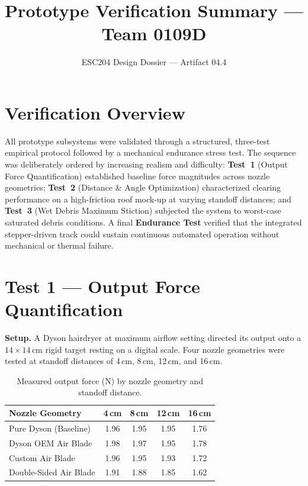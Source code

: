 \documentclass[12pt]{article}
\title{\vspace{-2cm}\textbf{Prototype Verification Summary --- Team 0109D}\vspace{-0.5cm}}
\author{ESC204 Design Dossier \textnormal{--- Artifact 04.4}}
\date{\vspace{-0.5cm}}
\begin{document}
\maketitle
\thispagestyle{empty}

\section{Verification Overview}

All prototype subsystems were validated through a structured, three-test empirical protocol followed by a mechanical endurance stress test. The sequence was deliberately ordered by increasing realism and difficulty: \textbf{Test~1} (Output Force Quantification) established baseline force magnitudes across nozzle geometries; \textbf{Test~2} (Distance \& Angle Optimization) characterized clearing performance on a high-friction roof mock-up at varying standoff distances; and \textbf{Test~3} (Wet Debris Maximum Stiction) subjected the system to worst-case saturated debris conditions. A final \textbf{Endurance Test} verified that the integrated stepper-driven track could sustain continuous automated operation without mechanical or thermal failure.

\section{Test 1 --- Output Force Quantification}

\textbf{Setup.} A Dyson hairdryer at maximum airflow setting directed its output onto a $14 \times 14$\,cm rigid target resting on a digital scale. Four nozzle geometries were tested at standoff distances of 4\,cm, 8\,cm, 12\,cm, and 16\,cm.

\begin{table}[H]
\centering
\caption{Measured output force (N) by nozzle geometry and standoff distance.}
\label{tab:test1}
\begin{tabular}{@{}lcccc@{}}
\toprule
\textbf{Nozzle Geometry} & \textbf{4\,cm} & \textbf{8\,cm} & \textbf{12\,cm} & \textbf{16\,cm} \\
\midrule
Pure Dyson (Baseline)    & 1.96 & 1.95 & 1.95 & 1.76 \\
Dyson OEM Air Blade      & 1.98 & 1.97 & 1.95 & 1.78 \\
Custom Air Blade          & 1.96 & 1.95 & 1.93 & 1.72 \\
Double-Sided Air Blade    & 1.91 & 1.88 & 1.85 & 1.62 \\
\bottomrule
\end{tabular}
\end{table}
\end{document}
